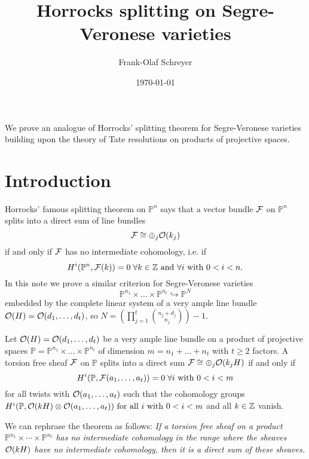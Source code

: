 \documentclass[twoside,12pt, leqno]{article}
\date{\today}
\title{Horrocks splitting on Segre-Veronese varieties }
\author{Frank-Olaf Schreyer
}
\def\PP{{\mathbb P}}
\def\PPn{{\PP^{n_1} \times \cdots  \times \PP^{n_t}}}
\begin{document}
\maketitle

\begin{abstract} 
\end{abstract}
We prove an analogue of Horrocks' splitting theorem for Segre-Veronese varieties building upon the theory 
of Tate resolutions on products of projective spaces. 
\section*{Introduction}

Horrocks' famous splitting theorem \cite{horrocks} on $\PP^n$ says that a vector bundle ${\mathcal F}$ on $\PP^n$ splits into a direct sum of line bundles
$${\mathcal F} \cong \oplus_j {\mathcal O}(k_j)$$ if and only if ${\mathcal F}$ has no intermediate cohomology, i.e. if
$$H^i(\PP^n,\sF(k))=0\;  \forall k \in \ZZ \hbox{ and } \forall i \hbox{ with } 0< i <n.$$
In this note we prove a similar criterion for Segre-Veronese varieties $$\PP^{n_1}\times \ldots \times \PP^{n_t} \hookrightarrow \PP^N$$ embedded
by the complete linear system of a very ample line bundle  ${\mathcal O}(H)={\mathcal O}(d_1,\ldots,d_t)$, so $N= (\prod_{j=1}^t {n_j+d_j \choose n_j}) -1$. 

\begin{theorem}\label{main} Let ${\mathcal O}(H) = {\mathcal O}(d_1,\ldots,d_t)$ be a very ample line bundle on 
a product of projective spaces $\PP=\PP^{n_1}\times \ldots \times \PP^{n_t}$ of dimension $m=n_1 +\ldots+n_t$ with $t \ge 2$ factors.
A torsion free sheaf ${\mathcal F}$ on $\PP$ splits into a direct sum ${\mathcal F}\cong \oplus_j {\mathcal O}(k_jH)$ if and only if
$$H^i(\PP,\sF(a_1,\ldots,a_t))=0\; \forall i \hbox{ with } 0<i<m$$
for all twists with ${\mathcal O}(a_1,\ldots,a_t)$ such that  the  cohomology groups $H^i(\PP,\sO(kH)\tensor \sO(a_1,\ldots,a_t)) \hbox{ for all } i \hbox{ with } 0<i<m$ and all $k \in {\mathbb Z} $ vanish.
\end{theorem}

We can rephrase the theorem as follows: {\it If a torsion free sheaf on a product $\PPn$ has no intermediate cohomology in the range where the sheaves ${\mathcal O}(kH)$ have no intermediate cohomology, then it is a direct sum of these sheaves.}
\end{document}
